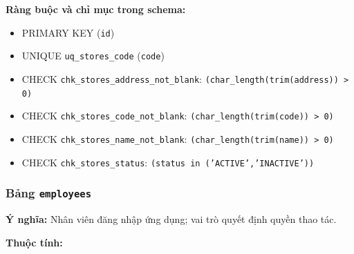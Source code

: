 \textbf{Ràng buộc và chỉ mục trong schema:}

\begin{itemize}

\item PRIMARY KEY (\texttt{id})

\item UNIQUE \texttt{uq\_stores\_code} (\texttt{code})

\item CHECK \texttt{chk\_stores\_address\_not\_blank}: \texttt{(char\_length(trim(address)) > 0)}

\item CHECK \texttt{chk\_stores\_code\_not\_blank}: \texttt{(char\_length(trim(code)) > 0)}

\item CHECK \texttt{chk\_stores\_name\_not\_blank}: \texttt{(char\_length(trim(name)) > 0)}

\item CHECK \texttt{chk\_stores\_status}: \texttt{(status in ('ACTIVE','INACTIVE'))}

\end{itemize}

\subsubsection{Bảng \texttt{employees}}

\textbf{Ý nghĩa:} Nhân viên đăng nhập ứng dụng; vai trò quyết định quyền thao tác.\par

\textbf{Thuộc tính:}

